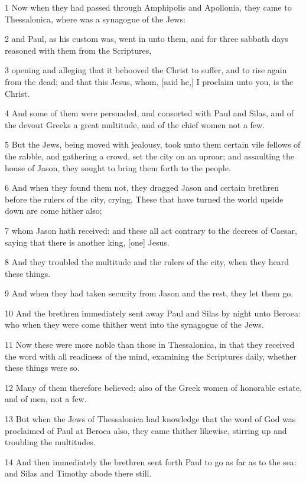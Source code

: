 \par 1 Now when they had passed through Amphipolis and Apollonia, they came to Thessalonica, where was a synagogue of the Jews:
\par 2 and Paul, as his custom was, went in unto them, and for three sabbath days reasoned with them from the Scriptures,
\par 3 opening and alleging that it behooved the Christ to suffer, and to rise again from the dead; and that this Jesus, whom, [said he,] I proclaim unto you, is the Christ.
\par 4 And some of them were persuaded, and consorted with Paul and Silas, and of the devout Greeks a great multitude, and of the chief women not a few.
\par 5 But the Jews, being moved with jealousy, took unto them certain vile fellows of the rabble, and gathering a crowd, set the city on an uproar; and assaulting the house of Jason, they sought to bring them forth to the people.
\par 6 And when they found them not, they dragged Jason and certain brethren before the rulers of the city, crying, These that have turned the world upside down are come hither also;
\par 7 whom Jason hath received: and these all act contrary to the decrees of Caesar, saying that there is another king, [one] Jesus.
\par 8 And they troubled the multitude and the rulers of the city, when they heard these things.
\par 9 And when they had taken security from Jason and the rest, they let them go.
\par 10 And the brethren immediately sent away Paul and Silas by night unto Beroea: who when they were come thither went into the synagogue of the Jews.
\par 11 Now these were more noble than those in Thessalonica, in that they received the word with all readiness of the mind, examining the Scriptures daily, whether these things were so.
\par 12 Many of them therefore believed; also of the Greek women of honorable estate, and of men, not a few.
\par 13 But when the Jews of Thessalonica had knowledge that the word of God was proclaimed of Paul at Beroea also, they came thither likewise, stirring up and troubling the multitudes.
\par 14 And then immediately the brethren sent forth Paul to go as far as to the sea: and Silas and Timothy abode there still.
